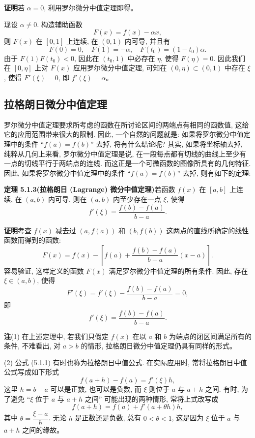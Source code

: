 \documentclass[UTF8,12pt,a4paper,fontset=fandol]{ctexart}
\begin{document}
\noindent\textbf{证明}\quad 若 $\alpha=0$, 利用罗尔微分中值定理即得。

现设 $\alpha\ne0$. 构造辅助函数
\[
  F(x)=f(x)-\alpha x,
\]
则 $F(x)$ 在 $[0,1]$ 上连续, 在 $(0,1)$ 内可导, 并且有
\[
  F(0)=0,\quad F(1)=-\alpha,\quad F(t_0)=(1-t_0)\alpha.
\]
由于 $F(1)F(t_0)<0$, 因此在 $(t_0,1)$ 中必存在 $\eta$, 使得 $F(\eta)=0$. 因此我们在 $[0,\eta]$ 上对 $F(x)$ 应用罗尔微分中值定理, 可知在 $(0,\eta)\subset(0,1)$ 中存在 $\xi$, 使得 $F'(\xi)=0$, 即 $f'(\xi)=\alpha$。

\subsection{拉格朗日微分中值定理}

罗尔微分中值定理要求所考虑的函数在所讨论区间的两端点有相同的函数值, 这给它的应用范围带来很大的限制. 因此, 一个自然的问题就是: 如果将罗尔微分中值定理中的条件 ``$f(a)=f(b)$'' 去掉, 将有什么结论呢? 其实, 如果将坐标轴去掉, 纯粹从几何上来看, 罗尔微分中值定理是说, 在一段每点都有切线的曲线上至少有一点的切线平行于两端点的连线. 而这正是一个可微函数的图像所具有的几何特征. 因此, 如果将罗尔微分中值定理中的条件 ``$f(a)=f(b)$'' 去掉, 则有如下的定理:

\noindent\textbf{定理 5.1.3(拉格朗日 (Lagrange) 微分中值定理)}\quad 若函数 $f(x)$ 在 $[a,b]$ 上连续, 在 $(a,b)$ 内可导, 则在 $(a,b)$ 内至少存在一点 $\xi$, 使得
\begin{equation}
  f'(\xi)=\frac{f(b)-f(a)}{b-a}.
  \tag{5.1.1}
\end{equation}

\noindent\textbf{证明}\quad 考查 $f(x)$ 减去过 $(a,f(a))$ 和 $(b,f(b))$ 这两点的直线所确定的线性函数而得到的函数:
\[
  F(x)=f(x)-\left[f(a)+\frac{f(b)-f(a)}{b-a}(x-a)\right].
\]
容易验证, 这样定义的函数 $F(x)$ 满足罗尔微分中值定理的所有条件. 因此, 存在 $\xi\in(a,b)$, 使得
\[
  F'(\xi)=f'(\xi)-\frac{f(b)-f(a)}{b-a}=0,
\]
即
\[
  f'(\xi)=\frac{f(b)-f(a)}{b-a}.
\]

\noindent\textbf{注}\quad (1) 在上述定理中, 若我们只假定 $f(x)$ 在以 $a$ 和 $b$ 为端点的闭区间满足所有的条件, 不难看出, 对 $a>b$ 的情形, 拉格朗日微分中值定理仍具有同样的形式。

(2) 公式 (5.1.1) 有时也称为拉格朗日中值公式. 在实际应用时, 常将拉格朗日中值公式写成如下形式
\[
  f(a+h)-f(a)=f'(\xi)h,
\]
这里 $h=b-a$ 可以是正数, 也可以是负数, 而 $\xi$ 则位于 $a$ 与 $a+h$ 之间. 有时, 为了避免 ``$\xi$ 位于 $a$ 与 $a+h$ 之间'' 可能出现的两种情形, 常将上式改写成
\[
  f(a+h)=f(a)+f'(a+\theta h)h,
\]
其中 $\theta=\dfrac{\xi-a}{h}$. 无论 $h$ 是正数还是负数, 总有 $0<\theta<1$, 这是因为 $\xi$ 位于 $a$ 与 $a+h$ 之间的缘故。
\end{document}
